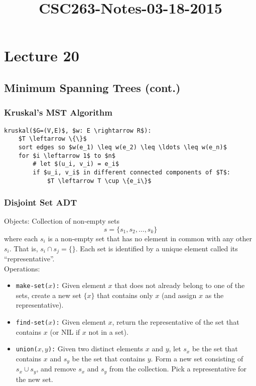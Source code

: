 



\title{CSC263-Notes-03-18-2015}



\section*{Lecture 20}

\subsection*{Minimum Spanning Trees (cont.)}

\subsubsection*{Kruskal's MST Algorithm}

\begin{lstlisting}[mathescape]
kruskal($G=(V,E)$, $w: E \rightarrow R$):
	$T \leftarrow \{\}$
	sort edges so $w(e_1) \leq w(e_2) \leq \ldots \leq w(e_n)$
	for $i \leftarrow 1$ to $n$
		# let $(u_i, v_i) = e_i$
	 	if $u_i, v_i$ in different connected components of $T$:
			$T \leftarrow T \cup \{e_i\}$
\end{lstlisting}

\subsubsection*{Disjoint Set ADT}

Objects: Collection of non-empty sets
$$ s = \{s_1, s_2, \ldots, s_k\} $$
where each $s_i$ is a non-empty set that has no element in common with any other $s_i$. That is, $s_i \cap s_j = \{\}$. Each set is identified by a unique element called its ``representative''. \\

\noindent Operations:

\begin{itemize}
	\item[] \texttt{make-set($x$):} Given element $x$ that does not already belong to one of the sets, create a new set $\{x\}$ that contains only $x$ (and assign $x$ as the representative).

	\item[] \texttt{find-set($x$):} Given element $x$, return the representative of the set that contains $x$ (or NIL if $x$ not in a set).

	\item[] \texttt{union($x,y$):} Given two distinct elements $x$ and $y$, let $s_x$ be the set that contains $x$ and $s_y$ be the set that contains $y$. Form a new set consisting of $s_x \cup s_y$, and remove $s_x$ and $s_y$ from the collection. Pick a representative for the new set.
\end{itemize}

